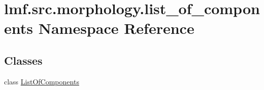 \hypertarget{namespacelmf_1_1src_1_1morphology_1_1list__of__components}{\section{lmf.\+src.\+morphology.\+list\+\_\+of\+\_\+components Namespace Reference}
\label{namespacelmf_1_1src_1_1morphology_1_1list__of__components}
}
\subsection*{Classes}
\begin{DoxyCompactItemize}
\item 
class \hyperlink{classlmf_1_1src_1_1morphology_1_1list__of__components_1_1_list_of_components}{List\+Of\+Components}
\end{DoxyCompactItemize}
